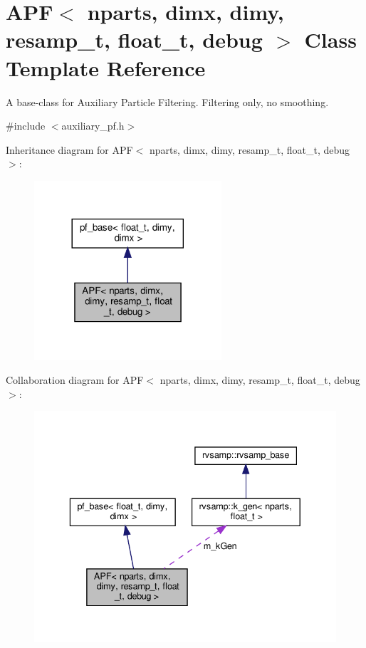 \hypertarget{classAPF}{}\section{A\+PF$<$ nparts, dimx, dimy, resamp\+\_\+t, float\+\_\+t, debug $>$ Class Template Reference}
\label{classAPF}


A base-\/class for Auxiliary Particle Filtering. Filtering only, no smoothing.  




{\ttfamily \#include $<$auxiliary\+\_\+pf.\+h$>$}



Inheritance diagram for A\+PF$<$ nparts, dimx, dimy, resamp\+\_\+t, float\+\_\+t, debug $>$\+:\nopagebreak
\begin{figure}[H]
\begin{center}
\leavevmode
\includegraphics[width=197pt]{classAPF__inherit__graph}
\end{center}
\end{figure}


Collaboration diagram for A\+PF$<$ nparts, dimx, dimy, resamp\+\_\+t, float\+\_\+t, debug $>$\+:\nopagebreak
\begin{figure}[H]
\begin{center}
\leavevmode
\includegraphics[width=336pt]{classAPF__coll__graph}
\end{center}
\end{figure}

